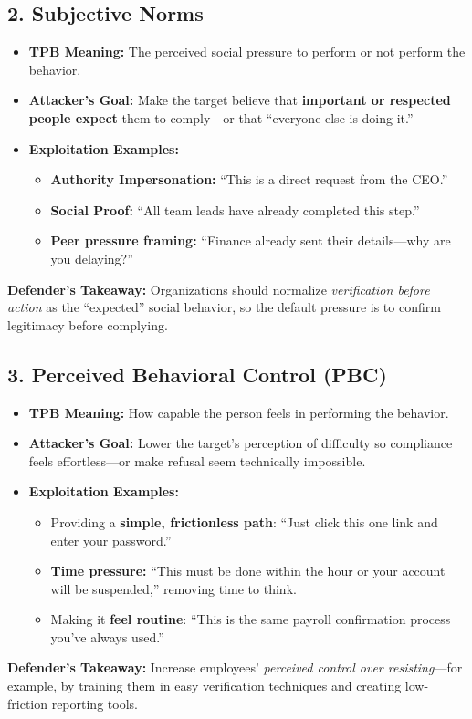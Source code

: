 \subsection{\textbf{2. Subjective Norms}}

\begin{itemize}
    \item \textbf{TPB Meaning:} The perceived social pressure to perform or not perform the behavior.
    \item \textbf{Attacker’s Goal:} Make the target believe that \textbf{important or respected people expect} them to comply—or that “everyone else is doing it.”
    \item \textbf{Exploitation Examples:}
    \begin{itemize}
        \item \textbf{Authority Impersonation:} “This is a direct request from the CEO.”
        \item \textbf{Social Proof:} “All team leads have already completed this step.”
        \item \textbf{Peer pressure framing:} “Finance already sent their details—why are you delaying?”
    \end{itemize}
\end{itemize}
\textbf{Defender’s Takeaway:} Organizations should normalize \textit{verification before action} as the “expected” social behavior, so the default pressure is to confirm legitimacy before complying.

\subsection{\textbf{3. Perceived Behavioral Control (PBC)}}

\begin{itemize}
    \item \textbf{TPB Meaning:} How capable the person feels in performing the behavior.
    \item \textbf{Attacker’s Goal:} Lower the target’s perception of difficulty so compliance feels effortless—or make refusal seem technically impossible.
    \item \textbf{Exploitation Examples:}
    \begin{itemize}
        \item Providing a \textbf{simple, frictionless path}: “Just click this one link and enter your password.”
        \item \textbf{Time pressure:} “This must be done within the hour or your account will be suspended,” removing time to think.
        \item Making it \textbf{feel routine}: “This is the same payroll confirmation process you’ve always used.”
    \end{itemize}
\end{itemize}
\textbf{Defender’s Takeaway:} Increase employees’ \textit{perceived control over resisting}—for example, by training them in easy verification techniques and creating low-friction reporting tools.

